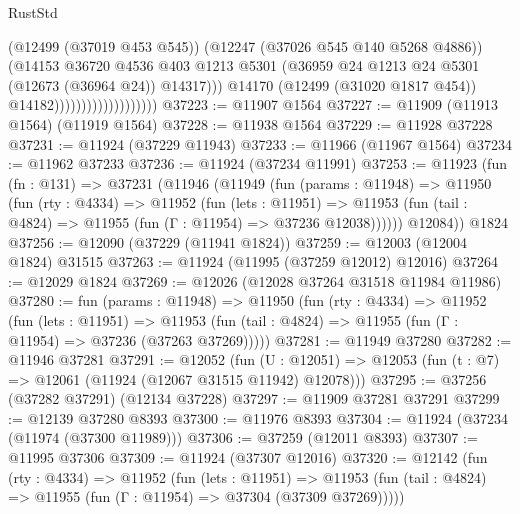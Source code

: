 \begin{lexlean}{RustStd}
\begin{coremodule}
                                            (@12499 (@37019 @453 @545))
                                            (@12247 (@37026 @545 @140 @5268 @4886))
                                            (@14153
                                              @36720
                                              @4536
                                              @403
                                              @1213
                                              @5301
                                              (@36959
                                                @24
                                                @1213
                                                @24
                                                @5301
                                                (@12673 (@36964 @24))
                                                @14317)))
                                          @14170
                                          (@12499 (@31020 @1817 @454))
                                          @14182)))))))))))))))))))
@37223 := @11907 @1564
@37227 := @11909 (@11913 @1564) (@11919 @1564)
@37228 := @11938 @1564
@37229 := @11928 @37228
@37231 := @11924 (@37229 @11943)
@37233 := @11966 (@11967 @1564)
@37234 := @11962 @37233
@37236 := @11924 (@37234 @11991)
@37253 := @11923
    (fun (fn : @131) =>
    @37231
      (@11946
        (@11949
          (fun (params : @11948) =>
          @11950
            (fun (rty : @4334) =>
            @11952
              (fun (lets : @11951) =>
              @11953 (fun (tail : @4824) => @11955 (fun (Γ : @11954) => @37236 @12038))))))
        @12084))
    @1824
@37256 := @12090 (@37229 (@11941 @1824))
@37259 := @12003 (@12004 @1824) @31515
@37263 := @11924 (@11995 (@37259 @12012) @12016)
@37264 := @12029 @1824
@37269 := @12026 (@12028 @37264 @31518 @11984 @11986)
@37280 := fun (params : @11948) =>
  @11950
    (fun (rty : @4334) =>
    @11952
      (fun (lets : @11951) =>
      @11953 (fun (tail : @4824) => @11955 (fun (Γ : @11954) => @37236 (@37263 @37269)))))
@37281 := @11949 @37280
@37282 := @11946 @37281
@37291 := @12052
    (fun (U : @12051) => @12053 (fun (t : @7) => @12061 (@11924 (@12067 @31515 @11942) @12078)))
@37295 := @37256 (@37282 @37291) (@12134 @37228)
@37297 := @11909 @37281 @37291
@37299 := @12139 @37280 @8393
@37300 := @11976 @8393
@37304 := @11924 (@37234 (@11974 (@37300 @11989)))
@37306 := @37259 (@12011 @8393)
@37307 := @11995 @37306
@37309 := @11924 (@37307 @12016)
@37320 := @12142
    (fun (rty : @4334) =>
    @11952
      (fun (lets : @11951) =>
      @11953 (fun (tail : @4824) => @11955 (fun (Γ : @11954) => @37304 (@37309 @37269)))))

\end{coremodule}
\end{lexlean}
